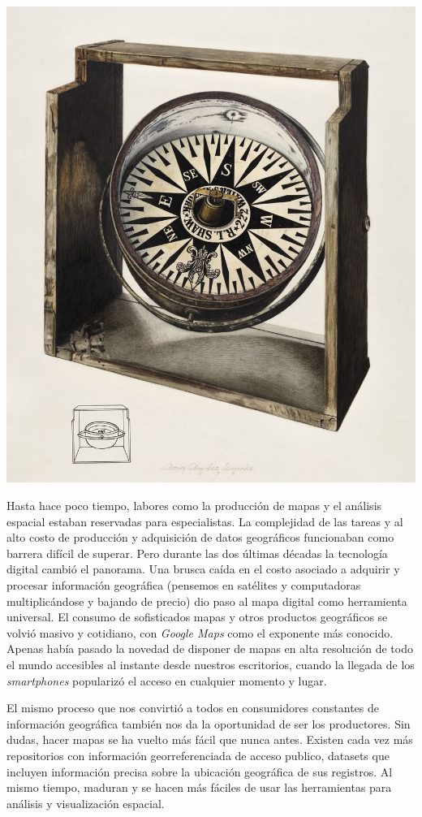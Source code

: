 \documentclass[
]{book}
\begin{document}
\includegraphics[width=1\linewidth]{imagenes/geo}

Hasta hace poco tiempo, labores como la producción de mapas y el análisis espacial estaban reservadas para especialistas. La complejidad de las tareas y al alto costo de producción y adquisición de datos geográficos funcionaban como barrera difícil de superar. Pero durante las dos últimas décadas la tecnología digital cambió el panorama. Una brusca caída en el costo asociado a adquirir y procesar información geográfica (pensemos en satélites y computadoras multiplicándose y bajando de precio) dio paso al mapa digital como herramienta universal. El consumo de sofisticados mapas y otros productos geográficos se volvió masivo y cotidiano, con \emph{Google Maps} como el exponente más conocido. Apenas había pasado la novedad de disponer de mapas en alta resolución de todo el mundo accesibles al instante desde nuestros escritorios, cuando la llegada de los \emph{smartphones} popularizó el acceso en cualquier momento y lugar.

El mismo proceso que nos convirtió a todos en consumidores constantes de información geográfica también nos da la oportunidad de ser los productores. Sin dudas, hacer mapas se ha vuelto más fácil que nunca antes. Existen cada vez más repositorios con información georreferenciada de acceso publico, datasets que incluyen información precisa sobre la ubicación geográfica de sus registros. Al mismo tiempo, maduran y se hacen más fáciles de usar las herramientas para análisis y visualización espacial.
\end{document}

